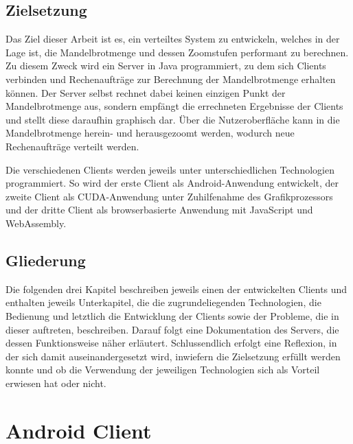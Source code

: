 \documentclass[12pt, onecolumn, notitlepage]{scrartcl}
\begin{document}
\subsection{Zielsetzung}
Das Ziel dieser Arbeit ist es, ein verteiltes System zu entwickeln, welches in der Lage ist, die Mandelbrotmenge und dessen Zoomstufen performant zu berechnen. Zu diesem Zweck wird ein Server in Java programmiert, zu dem sich Clients verbinden und Rechenaufträge zur Berechnung der Mandelbrotmenge erhalten können. Der Server selbst rechnet dabei keinen einzigen Punkt der Mandelbrotmenge aus, sondern empfängt die errechneten Ergebnisse der Clients und stellt diese daraufhin graphisch dar. Über die Nutzeroberfläche kann in die Mandelbrotmenge herein- und herausgezoomt werden, wodurch neue Rechenaufträge verteilt werden. \par
Die verschiedenen Clients werden jeweils unter unterschiedlichen Technologien programmiert. So wird der erste Client als Android-Anwendung entwickelt, der zweite Client als CUDA-Anwendung unter Zuhilfenahme des Grafikprozessors und der dritte Client als browserbasierte Anwendung mit JavaScript und WebAssembly. 
\subsection{Gliederung}
Die folgenden drei Kapitel beschreiben jeweils einen der entwickelten Clients und enthalten jeweils Unterkapitel, die die zugrundeliegenden Technologien, die Bedienung und letztlich die Entwicklung der Clients sowie der Probleme, die in dieser auftreten, beschreiben. Darauf folgt eine Dokumentation des Servers, die dessen Funktionsweise näher erläutert. Schlussendlich erfolgt eine Reflexion, in der sich damit auseinandergesetzt wird, inwiefern die Zielsetzung erfüllt werden konnte und ob die Verwendung der jeweiligen Technologien sich als Vorteil erwiesen hat oder nicht.


\section{Android Client}
\end{document}
